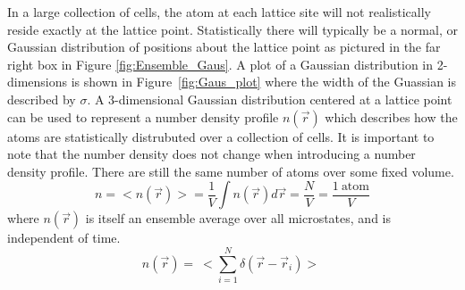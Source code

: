 \documentclass[double,12pt]{beavtex}
\begin{document}
In a large collection of cells, the atom at each lattice site
will not realistically reside exactly at the lattice point. 
Statistically there will typically be a normal, or Gaussian distribution 
of positions about the lattice point as pictured in the far right box in 
Figure \ref{fig:Ensemble_Gaus}. 
A plot of a Gaussian distribution in 2-dimensions is shown in Figure~\ref{fig:Gaus_plot}
where the width of the Guassian is described by $\sigma$.  
A 3-dimensional Gaussian distribution centered at a lattice point can be used to represent 
a number density profile $n(\vec{r})$  which describes how the atoms are 
statistically distrubuted over a collection of cells. 
It is important to note that the number density does not change when introducing a number 
density profile. There are still the same number of atoms over some fixed volume. 
\begin{equation}{n=<n(\vec{r})>=\frac{1}{V}\int{n(\vec{r})}{d\vec{r}}=\frac{N}{V}=\frac{1~\text{atom}}{V}}\end{equation}
where $n(\vec r)$ is itself an ensemble average over all microstates, and is independent of time.
\begin{equation}n(\vec r)=~<\sum_{i=1}^N\delta(\vec r - \vec r_i)>~\end{equation}
\end{document}
